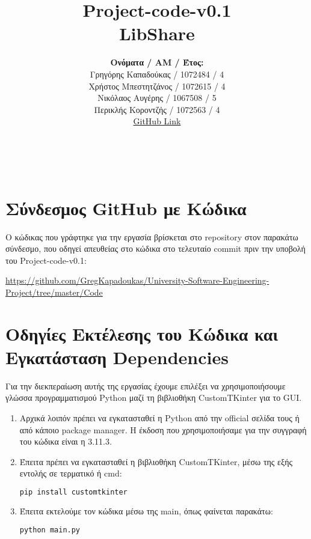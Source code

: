\documentclass[12pt,a4paper]{article}
\title{Project-code-v0.1 \\ LibShare}
\author{\textbf{Ονόματα / ΑΜ / Έτος:} \\ Γρηγόρης Καπαδούκας / 1072484 / 4\textdegree \\ Χρήστος Μπεστητζάνος / 1072615 / 4\textdegree \\ Νικόλαος Αυγέρης / 1067508 / 5\textdegree \\ Περικλής Κοροντζής / 1072563 / 4\textdegree\\ \href{https://github.com/GregKapadoukas/University-Software-Engineering-Project}{\color{blue}GitHub Link}}
\begin{document}
\makeatletter
\begin{center}
	\LARGE{\@title} \\
	\pagebreak
    \begin{LARGE}\@author\end{LARGE}
    \pagebreak
\end{center}

\section{Σύνδεσμος GitHub με Κώδικα}
Ο κώδικας που γράφτηκε για την εργασία βρίσκεται στο repository στον παρακάτω σύνδεσμο, που οδηγεί απευθείας στο κώδικα στο τελευταίο commit πριν την υποβολή του Project-code-v0.1:

\textcolor{blue}{\href{https://github.com/GregKapadoukas/University-Software-Engineering-Project/tree/master/Code}{https://github.com/GregKapadoukas/University-Software-Engineering-\\Project/tree/master/Code}}

\section{Οδηγίες Εκτέλεσης του Κώδικα και Εγκατάσταση Dependencies}
Για την διεκπεραίωση αυτής της εργασίας έχουμε επιλέξει να χρησιμοποιήσουμε γλώσσα προγραμματισμού Python μαζί τη βιβλιοθήκη CustomTKinter για το GUI.

\begin{enumerate}
    \item Αρχικά λοιπόν πρέπει να εγκατασταθεί η Python από την official σελίδα τους ή από κάποιο package manager. Η έκδοση που χρησιμοποιήσαμε για την συγγραφή του κώδικα είναι η 3.11.3.

    \item Έπειτα πρέπει να εγκατασταθεί η βιβλιοθήκη CustomTKinter, μέσω της εξής εντολής σε τερματικό ή cmd:

\begin{lstlisting}[language=Bash]
pip install customtkinter\end{lstlisting}

    \item Έπειτα εκτελούμε τον κώδικα μέσω της main, όπως φαίνεται παρακάτω:

\begin{lstlisting}[language=Bash]
python main.py\end{lstlisting}
\end{enumerate}
\end{document}
